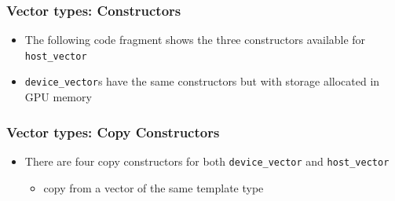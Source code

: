 \subsubsection{Vector types:
Constructors}\label{vector-types-constructors}

\begin{itemize}
\itemsep1pt\parskip0pt
\item
  The following code fragment shows the three constructors available for
  \texttt{host\_vector}
\end{itemize}

\begin{Shaded}
\begin{Highlighting}[]

\NormalTok{);}

\NormalTok{, }\NormalTok{);}
\end{Highlighting}
\end{Shaded}

\begin{itemize}
\itemsep1pt\parskip0pt
\item
  \texttt{device\_vector}s have the same constructors but with storage
  allocated in GPU memory
\end{itemize}

\subsubsection{Vector types: Copy
Constructors}\label{vector-types-copy-constructors}

\begin{itemize}
\item
  There are four copy constructors for both \texttt{device\_vector} and
  \texttt{host\_vector}

  \begin{itemize}
  \itemsep1pt\parskip0pt
  \item
    copy from a vector of the same template type
  \end{itemize}
\end{itemize}

